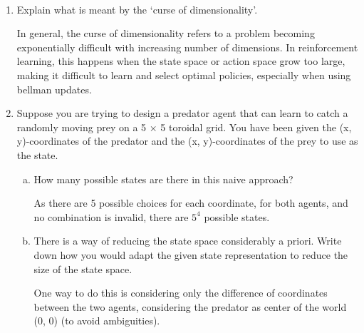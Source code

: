 \documentclass{exam}
\begin{document}
\begin{problem}[Introduction]
\ \newline

\begin{enumerate}
    \item Explain what is meant by the ‘curse of dimensionality’.

    \begin{solutionorlines}[2in]
        In general, the curse of dimensionality refers to a problem becoming exponentially difficult with increasing number of dimensions.
        In reinforcement learning, this happens when the state space or action space grow too large, making it difficult to learn and select optimal policies, especially when using bellman updates.
    \end{solutionorlines}
    
    \item Suppose you are trying to design a predator agent that can learn to catch a randomly moving prey on a 5 × 5 toroidal grid. You have been given the (x, y)-coordinates of the predator and the (x, y)-coordinates of the prey to use as the state.
        \begin{enumerate}[(a)]
            \item How many possible states are there in this naive approach?
                \begin{solutionorlines}[2in]
                As there are 5 possible choices for each coordinate, for both agents, and no combination is invalid, there are $5^4$ possible states.
                \end{solutionorlines}
            \item There is a way of reducing the state space considerably a priori. Write down how you would adapt the given state representation to reduce the size of the state space.
                \begin{solutionorlines}[2in]
                    One way to do this is considering only the difference of coordinates between the two agents, considering the predator as center of the world (0, 0) (to avoid ambiguities).
                \end{solutionorlines}


\end{enumerate}
\end{enumerate}
\end{problem}
\end{document}
